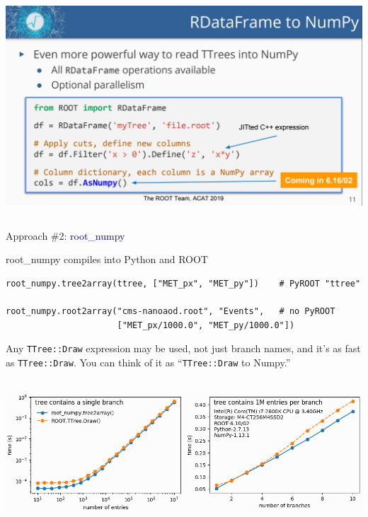 \documentclass[aspectratio=169]{beamer}
\begin{document}
\begin{frame}{}
\vspace{-0.1 cm}
\begin{columns}
\includegraphics[width=\linewidth]{03-coming-soon-2.png}
\end{columns}
\end{frame}

\begin{frame}{}
\LARGE
\begin{center}
Approach \#2: \textcolor{darkblue}{root\_numpy}
\end{center}
\end{frame}

\begin{frame}[fragile]{root\_numpy compiles into Python and ROOT}
\vspace{0.25 cm}
\small
\begin{verbatim}
root_numpy.tree2array(ttree, ["MET_px", "MET_py"])    # PyROOT "ttree"

root_numpy.root2array("cms-nanoaod.root", "Events",   # no PyROOT
                      ["MET_px/1000.0", "MET_py/1000.0"])
\end{verbatim}
\large

\vspace{0.25 cm}
Any {\tt TTree::Draw} expression may be used, not just branch names, and it's as fast as {\tt TTree::Draw}. You can think of it as ``{\tt TTree::Draw} to Numpy.''

\vspace{0.25 cm}
\mbox{ } \hfill \includegraphics[width=0.8\linewidth]{root-numpy-fast.png} \hfill \mbox{ }
\end{frame}
\end{document}
